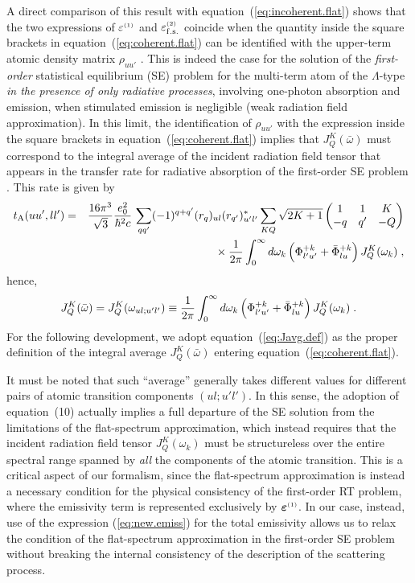\documentclass[preprint]{aastex}
\newcommand{\<}{{\kern-5pt}}
\newcommand{\thrj}[6]{\biggl(
	\begin{matrix}
	#1&#2&#3\\
	#4&#5&#6\\
	\end{matrix}\biggr)}
\newcommand{\apx}[1]{^{\mbox{\tiny{(#1)}}}}
\begin{document}
A direct comparison of this result with equation~(\ref{eq:incoherent.flat}) 
shows that the two expressions of $\varepsilon\apx{1}$ and 
$\varepsilon\apx{2}_{\rm f.s.}$ coincide when the quantity 
inside the square brackets in equation~(\ref{eq:coherent.flat}) can be
identified with the upper-term atomic density matrix $\rho_{uu'}$
\cite[][Section 7]{Ca14}.
%
This is indeed the case for the solution of the \emph{first-order} statistical 
equilibrium (SE) problem for the multi-term atom of the $\Lambda$-type 
\emph{in the presence of only radiative processes}, involving one-photon
absorption and emission, when stimulated emission is negligible (weak radiation 
field approximation).
%
In this limit, the identification of $\rho_{uu'}$ with the expression
inside the square brackets in equation~(\ref{eq:coherent.flat}) implies that 
$J^K_Q(\bar\omega)$ must correspond to the integral average of the 
incident radiation field tensor that appears in the transfer rate 
for radiative absorption of the first-order SE problem
\cite[cf.][]{La83,La84}. This rate is given by
%
\begin{eqnarray} \label{eq:tA}
t_{\rm A}(uu',ll')
&=& \frac{16\pi^3}{\sqrt3}\frac{e_0^2}{\hbar^2 c}\,
	\sum_{qq'} (-1)^{q+q'} (r_q)_{ul}
	(r_{q'})_{u'l'}^\ast
	\sum_{KQ}\sqrt{2K+1}\,
	\thrj{1}{1}{K}{-q}{q'}{-Q} \nonumber \\
&&{}\times \frac{1}{2\pi}\int_0^\infty d\omega_k\,
	\Bigl( \Phi_{l'u'}^{+k} + \bar\Phi_{lu}^{+k} \Bigr)\,
	J^K_Q(\omega_k)\;,
\end{eqnarray}
%
hence,
%
\begin{equation} \label{eq:Javg.def}
J^K_Q(\bar\omega)=
J^K_Q(\omega_{ul;u'l'})\equiv
\frac{1}{2\pi}
\int_{0}^\infty d\omega_{k}\,
	\Bigl(
	\Phi_{l'u'}^{+k} + \bar\Phi_{lu}^{+k}
	\Bigr)\,J^K_Q(\omega_k)\;.
\end{equation}
%
For the following development, we adopt equation~(\ref{eq:Javg.def}) 
as the proper definition of the integral average $J^K_Q(\bar\omega)$ 
entering equation~(\ref{eq:coherent.flat}).

It must be noted that such ``average'' generally takes different values 
for different pairs of atomic transition components $(ul;u'l')$. In
this sense, the adoption of equation~(10) actually implies a full 
departure of the SE solution from the limitations of the flat-spectrum
approximation, which instead requires that the incident radiation field 
tensor $J^K_Q(\omega_k)$ must be structureless over the entire spectral 
range spanned by \emph{all} the components of the atomic transition. 
%
This is a critical aspect of our formalism, since the flat-spectrum 
approximation is instead a necessary condition for the physical
consistency of the first-order RT problem, where the
emissivity term is represented exclusively by $\bm{\varepsilon}\apx{1}$.
In our case, instead, use of the expression (\ref{eq:new.emiss}) for the
total emissivity allows us to relax the condition of the flat-spectrum
approximation in the first-order SE problem without breaking the
internal consistency of the description of the scattering process.
\end{document}
